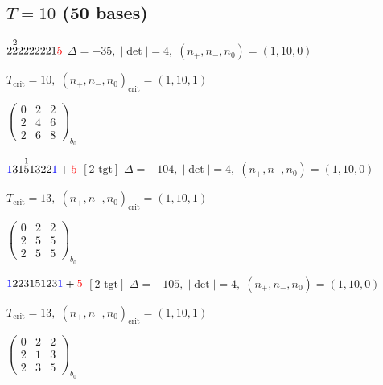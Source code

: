 \documentclass[10pt]{article}
\begin{document}
\subsection*{$T = 10$ \quad (50 bases)}
\smallskip

$2\overset{2}{2}2222221\textcolor{red}{5}$ \quad $\Delta=-35,\; |\det|=4,\; (n_+,n_-,n_0)=(1,10,0)$

\hspace{1em}$T_{\text{crit}}=10,\; (n_+,n_-,n_0)_{\text{crit}}=(1,10,1)$

\hspace{2em}$\left(\begin{smallmatrix}0 & 2 & 2 \\ 2 & 4 & 6 \\ 2 & 6 & 8\end{smallmatrix}\right)_{\!b_0}$

\smallskip

$\textcolor{blue}{1}31\overset{1}{5}1322\textcolor{blue}{1}+\textcolor{red}{5}$ $\scriptstyle [2\text{-tgt}]$ \quad $\Delta=-104,\; |\det|=4,\; (n_+,n_-,n_0)=(1,10,0)$

\hspace{1em}$T_{\text{crit}}=13,\; (n_+,n_-,n_0)_{\text{crit}}=(1,10,1)$

\hspace{2em}$\left(\begin{smallmatrix}0 & 2 & 2 \\ 2 & 5 & 5 \\ 2 & 5 & 5\end{smallmatrix}\right)_{\!b_0}$

\smallskip

$\textcolor{blue}{1}22315123\textcolor{blue}{1}+\textcolor{red}{5}$ $\scriptstyle [2\text{-tgt}]$ \quad $\Delta=-105,\; |\det|=4,\; (n_+,n_-,n_0)=(1,10,0)$

\hspace{1em}$T_{\text{crit}}=13,\; (n_+,n_-,n_0)_{\text{crit}}=(1,10,1)$

\hspace{2em}$\left(\begin{smallmatrix}0 & 2 & 2 \\ 2 & 1 & 3 \\ 2 & 3 & 5\end{smallmatrix}\right)_{\!b_0}$

\smallskip
\end{document}
